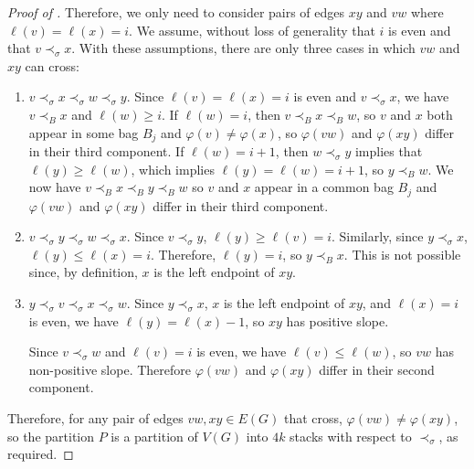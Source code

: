 \documentclass{patmorin}
\begin{document}
\begin{proof}[Proof of ]
  Therefore, we only need to consider pairs of edges $xy$ and $vw$ where $\ell(v)=\ell(x)=i$. We assume, without loss of generality that $i$ is even
  and that $v\prec_\sigma x$.  With these assumptions, there are only three cases in which $vw$ and $xy$ can cross:
  \begin{enumerate}
    \item $v\prec_\sigma x\prec_\sigma w\prec_\sigma y$. Since $\ell(v)=\ell(x)=i$ is even and $v\prec_\sigma x$, we have $v\prec_B x$ and $\ell(w)\ge i$.  If $\ell(w)=i$, then $v\prec_B x\prec_B w$, so $v$ and $x$ both appear in some bag $B_j$ and $\varphi(v)\neq\varphi(x)$, so $\varphi(vw)$ and $\varphi(xy)$ differ in their third component.  If $\ell(w)=i+1$, then $w\prec_\sigma y$ implies that $\ell(y)\ge\ell(w)$, which implies $\ell(y)=\ell(w)=i+1$, so $y\prec_B w$.  We now have $v\prec_B x\prec_B y\prec_B w$ so $v$ and $x$ appear in a common bag $B_j$ and $\varphi(vw)$ and $\varphi(xy)$ differ in their third component.

    \item $v\prec_\sigma y\prec_\sigma w\prec_\sigma x$.  Since $v\prec_\sigma y$, $\ell(y)\ge \ell(v)=i$.  Similarly, since $y\prec_\sigma x$, $\ell(y)\le\ell(x)=i$.  Therefore, $\ell(y)=i$, so $y\prec_B x$.  This is not possible since, by definition, $x$ is the left endpoint of $xy$.

    \item $y\prec_\sigma v\prec_\sigma x\prec_\sigma w$.  Since $y\prec_\sigma x$, $x$ is the left endpoint of $xy$, and $\ell(x)=i$ is even, we have $\ell(y)=\ell(x)-1$, so $xy$ has positive slope.

    Since $v\prec_\sigma w$ and $\ell(v)=i$ is even, we have $\ell(v)\le\ell(w)$, so $vw$ has non-positive slope.  Therefore $\varphi(vw)$ and $\varphi(xy)$ differ in their second component.
  \end{enumerate}
  Therefore, for any pair of edges $vw,xy\in E(G)$ that cross, $\varphi(vw)\neq\varphi(xy)$, so the partition $P$ is a partition of $V(G)$ into $4k$ stacks with respect to $\prec_\sigma$, as required.
\end{proof}
\end{document}

